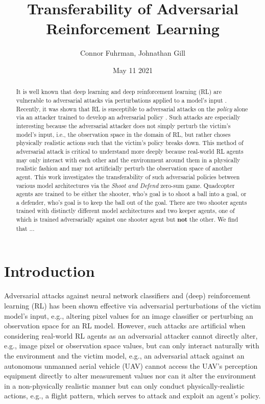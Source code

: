 \documentclass{article}
\title{Transferability of Adversarial Reinforcement Learning}
\author{Connor Fuhrman, Johnathan Gill}
\date{May 11 2021}
\begin{document}
\maketitle

\begin{abstract}
It is well known that deep learning and deep reinforcement learning (RL) are vulnerable to adversarial attacks via perturbations applied to a model's input \cite{Szegedy2014}. 
Recently, it was shown that RL is susceptible to adversarial attacks on the \textit{policy} alone via an attacker trained to develop an adversarial policy \cite{Gleave2019}. 
Such attacks are especially interesting because the adversarial attacker does not simply perturb the victim's model's input, i.e., the observation space in the domain of RL, but rather choses physically realistic actions such that the victim's policy breaks down. 
This method of adversarial attack is critical to understand more deeply because real-world RL agents may only interact with each other and the environment around them in a physically realistic fashion and may not artificially perturb the observation space of another agent. 
This work investigates the transferability of such adversarial policies between various model architectures via the \textit{Shoot and Defend} zero-sum game. 
Quadcopter agents are trained to be either the shooter, who's goal is to shoot a ball into a goal, or a defender, who's goal is to keep the ball out of the goal. 
There are two shooter agents trained with distinctly different model architectures and two keeper agents, one of which is trained adversarially against one shooter agent but \textbf{not} the other. 
We find that ...
\end{abstract}

\newpage

\section{Introduction}\label{sec:intro}
Adversarial attacks against neural network classifiers \cite{Szegedy2014} and (deep) reinforcement learning (RL) \cite{Gleave2019} has been shown effective via adversarial perturbations of the victim model's input, e.g., altering pixel values for an image classifier or perturbing an observation space for an RL model. 
However, such attacks are artificial when considering real-world RL agents as an adversarial attacker cannot directly alter, e.g., image pixel or observation space values, but can only interact naturally with the environment and the victim model, e.g., an adversarial attack against an autonomous unmanned aerial vehicle (UAV) cannot access the UAV's perception equipment directly to alter measurement values nor can it alter the environment in a non-physically realistic manner but can only conduct physically-realistic actions, e.g., a flight pattern, which serves to attack and exploit an agent's policy.  \\
\end{document}
